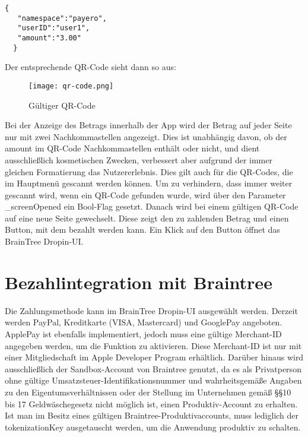 \begin{lstlisting}[caption={Gültiger QR-Code}]
  {
   "namespace":"payero",
   "userID":"user1",
   "amount":"3.00"
  }
\end{lstlisting}

Der entsprechende QR-Code sieht dann so aus:

\begin{figure}[H]
  \centering
  \texttt{[image: qr-code.png]}
  \caption{Gültiger QR-Code}
\end{figure}

Bei der Anzeige des Betrags innerhalb der App wird der Betrag auf jeder Seite nur mit zwei Nachkommastellen angezeigt.
Dies ist unabhängig davon, ob der \glqq amount\grqq{} im QR-Code Nachkommastellen enthält oder nicht, und dient ausschließlich kosmetischen Zwecken, verbessert aber aufgrund der immer gleichen Formatierung das Nutzererlebnis.
Dies gilt auch für die QR-Codes, die im Hauptmenü gescannt werden können.
Um zu verhindern, dass immer weiter gescannt wird, wenn ein QR-Code gefunden wurde, wird über den Parameter \glqq \_screenOpened\grqq{} ein Bool-Flag gesetzt.
Danach wird bei einem gültigen QR-Code auf eine neue Seite gewechselt.
Diese zeigt den zu zahlenden Betrag und einen Button, mit dem bezahlt werden kann.
Ein Klick auf den Button öffnet das BrainTree Dropin-UI.

\section{Bezahlintegration mit Braintree}

Die Zahlungsmethode kann im BrainTree Dropin-UI ausgewählt werden.
Derzeit werden PayPal, Kreditkarte (VISA, Mastercard) und GooglePay angeboten.
ApplePay ist ebenfalls implementiert, jedoch muss eine gültige Merchant-ID angegeben werden, um die Funktion zu aktivieren.
Diese Merchant-ID ist nur mit einer Mitgliedschaft im Apple Developer Program erhältlich.
Darüber hinaus wird ausschließlich der Sandbox-Account von Braintree genutzt, da es als Privatperson ohne gültige Umsatzsteuer-Identifikationsnummer und wahrheitsgemäße Angaben zu den Eigentumsverhältnissen oder der Stellung im Unternehmen gemäß \S\S 10 bis 17 Geldwäschegesetz nicht möglich ist, einen Produktiv-Account zu erhalten.
Ist man im Besitz eines gültigen Braintree-Produktivaccounts, muss lediglich der \glqq tokenizationKey\grqq{} ausgetauscht werden, um die Anwendung produktiv zu schalten.

